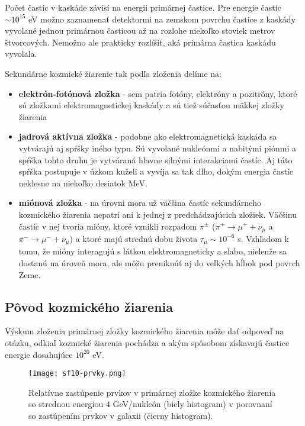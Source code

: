 \documentclass[../../main.tex]{subfiles}
\begin{document}
 Počet častíc v kaskáde závisí na energii primárnej častice. Pre energie častíc $\sim 10^{15}$ eV možno zaznamenať detektormi na zemskom povrchu častice z kaskády vyvolané jednou primárnou časticou až na rozlohe niekoľko stoviek metrov štvorcových. Nemožno ale prakticky rozlíšiť, aká primárna častica kaskádu vyvolala.
 
Sekundárne kozmické žiarenie tak podľa zloženia delíme na:
\begin{itemize}
\item \textbf{elektrón-fotónová zložka} - sem patria fotóny, elektróny a pozitróny, ktoré sú zložkami elektromagnetickej kaskády a sú tiež súčasťou mäkkej zložky žiarenia
\item \textbf{jadrová aktívna zložka} - podobne ako elektromagnetická kaskáda sa vytvárajú aj spŕšky iného typu. Sú vyvolané nukleónmi a nabitými piónmi a spŕška tohto druhu je vytváraná hlavne silnými interakciami častíc. Aj táto spŕška postupuje v úzkom kuželi a vyvíja sa tak dlho, dokým energia častíc neklesne na niekoľko desiatok MeV.
\item \textbf{miónová zložka} - na úrovni mora už väčšina častíc sekundárneho kozmického žiarenia nepatrí ani k jednej z predchádzajúcich zložiek. Väčšinu častíc v nej tvoria mióny, ktoré vznikli rozpadom $\pi^\pm$ ($\pi^+\rightarrow\mu^++\nu_\mu$ a $\pi^-\rightarrow\mu^-+\bar{\nu}_\mu$) a ktoré majú strednú dobu života $\tau_\mu\sim 10^{-6}$ s. Vzhľadom k tomu, že mióny interagujú s látkou elektromagneticky a slabo, nielenže sa dostanú na úroveň mora, ale môžu preniknúť aj do veľkých hĺbok pod povrch Zeme. 
\end{itemize}

\subsection{Pôvod kozmického žiarenia}

Výskum zloženia primárnej zložky kozmického žiarenia môže dať odpoveď na otázku, odkiaľ kozmické žiarenia pochádza a akým spôsobom získavajú častice energie dosahujúce $10^{20}$ eV.

\begin{figure}[h]
\centering
\texttt{[image: sf10-prvky.png]}
\caption{Relatívne zastúpenie prvkov v primárnej zložke kozmického žiarenia so strednou energiou $4$ GeV/nukleón (biely histogram) v porovnaní so zastúpením prvkov v galaxii (čierny histogram).}
\label{sf10:img:prvky}
\end{figure}
\end{document}
